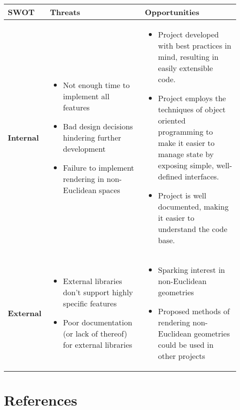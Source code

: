 \documentclass[12pt]{article}
\begin{document}
\begin{table}[H]
	\centering
	\begin{tabular}{|p{0.15\linewidth}|p{0.4\linewidth}|p{0.4\linewidth}|}
		\hline
		\textbf{SWOT} & \textbf{Threats}                                                                             & \textbf{Opportunities} \\ \hline
		\textbf{Internal}
		              & \begin{itemize}
			                \itemsep0em
			                \item Not enough time to implement all features
			                \item Bad design decisions hindering further development
			                \item Failure to implement rendering in non-Euclidean spaces
		                \end{itemize}
		              &
		\begin{itemize}
			\itemsep0em
			\item Project developed with best practices in mind, resulting in easily extensible code.
			\item Project employs the techniques of object oriented programming to make it easier to manage state by exposing simple, well-defined interfaces.
			\item Project is well documented, making it easier to understand the code base.
		\end{itemize}
		\\ \hline
		\textbf{External}
		              &
		\begin{itemize}
			\itemsep0em
			\item External libraries don't support highly specific features
			\item Poor documentation (or lack of thereof) for external libraries
		\end{itemize}
		              & \begin{itemize}
			                \itemsep0em
			                \item Sparking interest in non-Euclidean geometries
			                \item Proposed methods of rendering non-Euclidean geometries could be used in other projects
		                \end{itemize}                           \\  \hline
	\end{tabular}

\end{table}

\newpage
\section{References}
\printbibliography
\end{document}

